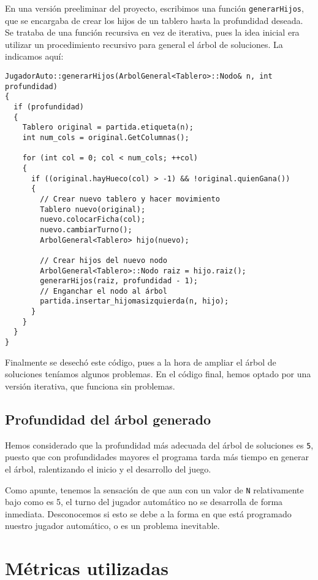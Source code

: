 \documentclass[11pt]{article}
\begin{document}
En una versión preeliminar del proyecto, escribimos una función \texttt{generarHijos}, que se encargaba de crear los hijos de un tablero hasta la profundidad deseada. Se trataba de una función recursiva en vez de iterativa, pues la idea inicial era utilizar un procedimiento recursivo para general el árbol de soluciones. La indicamos aquí:

\begin{verbatim}
JugadorAuto::generarHijos(ArbolGeneral<Tablero>::Nodo& n, int profundidad)
{
  if (profundidad)
  {
    Tablero original = partida.etiqueta(n);
    int num_cols = original.GetColumnas();

    for (int col = 0; col < num_cols; ++col)
    {
      if ((original.hayHueco(col) > -1) && !original.quienGana())
      {
        // Crear nuevo tablero y hacer movimiento
        Tablero nuevo(original);
        nuevo.colocarFicha(col);
        nuevo.cambiarTurno();
        ArbolGeneral<Tablero> hijo(nuevo);

        // Crear hijos del nuevo nodo
        ArbolGeneral<Tablero>::Nodo raiz = hijo.raiz();
        generarHijos(raiz, profundidad - 1);
        // Enganchar el nodo al árbol
        partida.insertar_hijomasizquierda(n, hijo);
      }
    }
  }
}
\end{verbatim}

Finalmente se desechó este código, pues a la hora de ampliar el árbol de soluciones teníamos algunos problemas. En el código final, hemos optado por una versión iterativa, que funciona sin problemas.

\subsection{Profundidad del árbol generado}
\label{sec-1-4}

Hemos considerado que la profundidad más adecuada del árbol de soluciones es \texttt{5},
puesto que con profundidades mayores el programa tarda más tiempo en generar el
árbol, ralentizando el inicio y el desarrollo del juego.

Como apunte, tenemos la sensación de que aun con un valor de \texttt{N} relativamente bajo como es 5, el turno del jugador automático no se desarrolla de forma inmediata. Desconocemos si esto se debe a la forma en que está programado nuestro jugador automático, o es un problema inevitable.

\section{Métricas utilizadas}
\label{sec-2}
\end{document}
